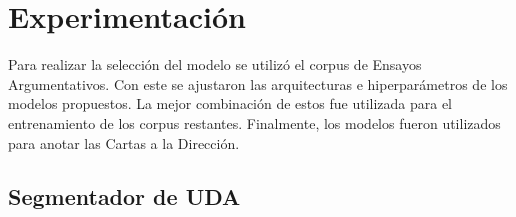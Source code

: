 \documentclass[a4paper,11pt,twocolumn,twoside]{article}
\begin{document}


\section{Experimentación}

Para realizar la selección del modelo se utilizó el corpus de Ensayos Argumentativos. Con este se ajustaron
las arquitecturas e hiperparámetros de los modelos propuestos. La mejor combinación de estos fue utilizada 
para el entrenamiento de los corpus restantes. Finalmente, los modelos fueron utilizados para anotar las Cartas 
a la Dirección. 



\subsection{Segmentador de UDA}
\end{document}
